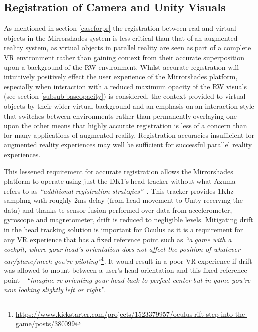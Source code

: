 
\subsection{Registration of Camera and Unity Visuals}
\label{registration-of-camera-and-unity-visuals}
As mentioned in section \ref{caseforpr} the registration between real and virtual objects in the Mirrorshades system is less critical than that of an augmented reality system, as virtual objects in parallel reality are seen as part of a complete VR environment rather than gaining context from their accurate superposition upon a background of the RW environment. Whilst accurate registration will intuitively positively effect the user experience of the Mirrorshades platform, especially when interaction with a reduced maximum opacity of the RW visuals (see section \ref{subsub-baseopacity}) is considered, the context provided to virtual objects by their wider virtual background and an emphasis on an interaction style that switches between environments rather than permanently overlaying one upon the other means that highly accurate registration is less of a concern than for many applications of augmented reality. Registration accuracies insufficient for augmented reality experiences may well be sufficient for successful parallel reality experiences.

This lessened requirement for accurate registration allows the Mirrorshades platform to operate using just the DK1's head tracker without what Azuma refers to as \textit{``additional registration strategies''}~\cite{Azuma1997}. This tracker provides 1Khz sampling with roughly 2ms delay (from head movement to Unity receiving the data) and thanks to sensor fusion performed over data from accelerometer, gyroscope and magnetometer, drift is reduced to negligible levels. Mitigating drift in the head tracking solution is important for Oculus as it is a requirement for any VR experience that has a fixed reference point such as \textit{``a game with a cockpit, where your head's orientation does not affect the position of whatever car/plane/mech you're piloting''}\footnote{\url{https://www.kickstarter.com/projects/1523379957/oculus-rift-step-into-the-game/posts/380099}}\saveFN\rifttrackerfn. It would result in a poor VR experience if drift was allowed to mount between a user's head orientation and this fixed reference point - \textit{``imagine re-orienting your head back to perfect center but in-game you're now looking slightly left or right''}.

